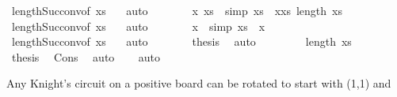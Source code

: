 \begin{isabellebody}
\ length{\isacharunderscore}{\kern0pt}Suc{\isacharunderscore}{\kern0pt}conv{\isacharbrackleft}{\kern0pt}of\ xs\ {}{\isacharbrackright}{\kern0pt}\ \isamarkupfalse%
\ auto\isanewline
\ \ \ \ \isamarkupfalse%
\ \isamarkupfalse%
\ x\ xs\ \ {\isacharbrackleft}{\kern0pt}simp{\isacharbrackright}{\kern0pt}{\isacharcolon}{\kern0pt}\ {\isachardoublequoteopen}xs\ {\isacharequal}{\kern0pt}\ xxs\ {\isachardoublequoteopen}length\ xs\ {\isacharequal}{\kern0pt}\ {}{\isachardoublequoteclose}\isanewline
\ \ \ \ \ \ \isamarkupfalse%
\ length{\isacharunderscore}{\kern0pt}Suc{\isacharunderscore}{\kern0pt}conv{\isacharbrackleft}{\kern0pt}of\ xs\ {}{\isacharbrackright}{\kern0pt}\ \isamarkupfalse%
\ auto\isanewline
\ \ \ \ \isamarkupfalse%
\ \isamarkupfalse%
\ x\ \ {\isacharbrackleft}{\kern0pt}simp{\isacharbrackright}{\kern0pt}{\isacharcolon}{\kern0pt}\ {\isachardoublequoteopen}xs\ {\isacharequal}{\kern0pt}\ {\isacharbrackleft}{\kern0pt}x\isanewline
\ \ \ \ \ \ \isamarkupfalse%
\ length{\isacharunderscore}{\kern0pt}Suc{\isacharunderscore}{\kern0pt}conv{\isacharbrackleft}{\kern0pt}of\ xs\ {}{\isacharbrackright}{\kern0pt}\ \isamarkupfalse%
\ auto\isanewline
\ \ \ \ \isamarkupfalse%
\ \isamarkupfalse%
\ {\isacharquery}{\kern0pt}thesis\ \isamarkupfalse%
\ auto\isanewline
\ \ \isamarkupfalse%
\isanewline
\ \ \ \ \isamarkupfalse%
\ {\isachardoublequoteopen}length\ xs\ {\isachargreater}{\kern0pt}\ {}{\isachardoublequoteclose}\isanewline
\ \ \ \ \isamarkupfalse%
\ \isamarkupfalse%
\ {\isacharquery}{\kern0pt}thesis\ \isamarkupfalse%
\ Cons\ \isamarkupfalse%
\ auto\isanewline
\ \ \isamarkupfalse%
\isanewline
{}\isamarkupfalse%
\ auto%
\endisatagproof
{\isafoldproof}%
%
\isadelimproof
%
\endisadelimproof
%
\begin{isamarkuptext}%
Any Knight's circuit on a positive board can be rotated to start with (1,1) and 

\end{isamarkuptext}
\end{isabellebody}
